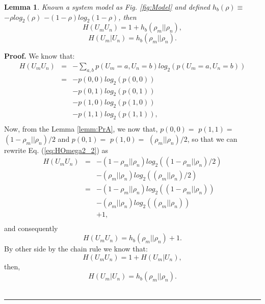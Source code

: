 \documentclass[a4paper,10pt]{article}
\newtheorem{mylemma}[mytheorem]{Lemma}
\newenvironment{myproof}[1][Proof]{\textbf{#1.} }{\ \rule{0.5em}{0.5em}}
\begin{document}
\begin{mdframed}[style=MDFStyGrayScreen]
\begin{mylemma}
 \label{lemm:HOmega2}
 Known a system model as Fig. \ref{fig:Model} and defined $h_{b}(\rho) \equiv$ 
 $-\rho log_2(\rho)$ $-(1-\rho) log_2(1-\rho)$, then
\begin{equation}\label{eq:HOmega2_z}
H(U_m U_n)= 1 + h_{b}(\rho_m||\rho_n),
\end{equation}
\begin{equation}\label{eq:HOmega2_y}
H(U_m|U_n)=  h_{b}(\rho_m||\rho_n).
\end{equation}
\end{mylemma}
\end{mdframed}

\begin{myproof}\label{proof:HOmega2}
We know that:
\begin{equation}\label{eq:HOmega2_2}
\begin{matrix}
H(U_m U_n) & = &  -\sum_{a,b} p(U_m=a, U_n=b) log_2(p(U_m=a, U_n=b))\\ 
~          & = & -p(0, 0) log_2(p(0, 0))\\ 
~          & ~ & -p(0, 1) log_2(p(0, 1))\\
~          & ~ & -p(1, 0) log_2(p(1, 0))\\
~          & ~ & -p(1, 1) log_2(p(1, 1)),\\
\end{matrix}
\end{equation}
Now, from the Lemma \ref{lemm:PrA}, we now that, $p(0,0)=$ 
$p(1, 1)=$ $(1-\rho_m ||\rho_n )/2$ and
$p(0, 1)=$ 
$p(1, 0)=$ $(\rho_m||\rho_n)/2$, so that we can rewrite 
Eq. (\ref{eq:HOmega2_2}) as
\begin{equation}\label{eq:HOmega2_3}
\begin{matrix}
H(U_m U_n) & = & -(1-\rho_m ||\rho_n )log_2((1-\rho_m ||\rho_n )/2)\\ 
~          & ~ & -(\rho_m||\rho_n) log_2((\rho_m||\rho_n)/2)\\
~          & = & -(1-\rho_m ||\rho_n )log_2((1-\rho_m ||\rho_n ))\\ 
~          & ~ & -(\rho_m||\rho_n) log_2((\rho_m||\rho_n))\\
~          & ~ & +1,\\
\end{matrix}
\end{equation}
and consequently
\begin{equation}\label{eq:HOmega2_4}
H(U_m U_n)= h_{b}(\rho_m||\rho_n)+1.
\end{equation}
By other side by the chain rule we know that:
\begin{equation}\label{eq:HOmega2_5}
H(U_m U_n)= 1 + H(U_m|U_n),
\end{equation}
then,
\begin{equation}\label{eq:HOmega2_6}
H(U_m|U_n)= h_{b}(\rho_m||\rho_n).
\end{equation}
\end{myproof}
\end{document}
